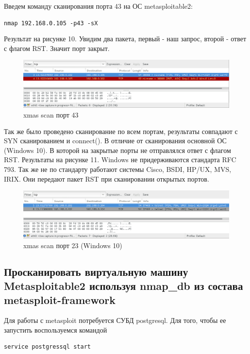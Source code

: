 \documentclass[11pt, a4paper]{article}		%
\begin{document}
Введем команду сканирования порта 43 на ОС metasploitable2: 

\verb'nmap 192.168.0.105 -p43 -sX'

Результат на рисунке 10. Увидим два пакета, первый - наш запрос, второй - ответ с флагом RST. Значит порт закрыт.

\begin{figure}[h!]
\centering
\includegraphics[scale=0.8]{res/xmas_scan_43}
\caption{xmas scan порт 43}
\end{figure}

Так же было проведено сканирование по всем портам, результаты совпадают с SYN сканированием и connect(). В отличие от сканирования основной ОС (Windows 10). В которой на закрытые порты не отправлялся ответ с флагом RST. Результаты на рисунке 11. Windows не придерживаются стандарта RFC 793. Так же не по стандарту работают системы Cisco, BSDI, HP/UX, MVS, IRIX. Они передают пакет RST при сканировании открытых портов.

\begin{figure}[h!]
\centering
\includegraphics[scale=0.8]{res/xmas_scan_23}
\caption{xmas scan порт 23 (Windows 10)}
\end{figure}



\subsection{Просканировать виртуальную машину Metasploitable2 используя nmap\_db из состава metasploit-framework}

Для работы с metasploit потребуется СУБД postgresql. Для того, чтобы ее запустить воспользуемся командой 

\verb'service postgressql start'
\end{document}
